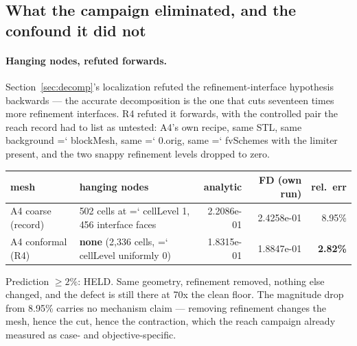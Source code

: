 \documentclass[11pt,a4paper]{article}
\newcommand{\artifact}[1]{{\small\ttfamily\hyphenchar\font=`\-\relax
  \def\_{\textunderscore\allowbreak}#1}}
\begin{document}
\subsection{What the campaign eliminated, and the confound it did not}
\label{sec:eliminated}

\paragraph{Hanging nodes, refuted forwards.} Section~\ref{sec:decomp}'s localization refuted
the refinement-interface hypothesis backwards --- the accurate decomposition is the one that
cuts seventeen times more refinement interfaces. R4 refuted it forwards, with the controlled
pair the reach record had to list as untested: A4's own recipe, same STL, same background
\artifact{blockMesh}, same \artifact{0.orig}, same \artifact{fvSchemes} with the limiter
present, and the two snappy refinement levels dropped to zero.

\begin{table}[htbp]
\centering\small
\begin{tabular}{@{}L{4.6cm}L{4.4cm}rrr@{}}
\toprule
mesh & hanging nodes & analytic & FD (own run) & rel.\ err \\
\midrule
A4 coarse (record) & 502 cells at \artifact{cellLevel} 1, 456 interface faces & 2.2086e-01 & 2.4258e-01 & 8.95\% \\
A4 conformal (R4) & \textbf{none} (2{,}336 cells, \artifact{cellLevel} uniformly 0) & 1.8315e-01 & 1.8847e-01 & \textbf{2.82\%} \\
\bottomrule
\end{tabular}
\end{table}

\noindent
Prediction \(\ge 2\%\): HELD. Same geometry, refinement removed, nothing else changed, and
the defect is still there at 70x the clean floor. The magnitude drop from 8.95\% carries no
mechanism claim --- removing refinement changes the mesh, hence the cut, hence the
contraction, which the reach campaign already measured as case- and objective-specific.
\end{document}
